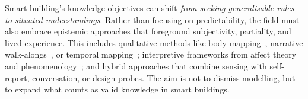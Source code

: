 Smart building's knowledge objectives can shift \textit{from seeking generalisable rules to situated understandings}. Rather than focusing on predictability, the field must also embrace epistemic approaches that foreground subjectivity, partiality, and lived experience. This includes qualitative methods like body mapping~\cite{turmo2023towards}, narrative walk-alongs~\cite{resch2015urban}, or temporal mapping~\cite{turmo2025temporal}; interpretive frameworks from affect theory and phenomenology~\cite{lottridge2011affective, fritsch2025sticking}; and hybrid approaches that combine sensing with self-report, conversation, or design probes. The aim is not to dismiss modelling, but to expand what counts as valid knowledge in smart buildings.







